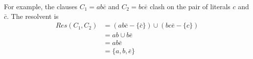 \documentclass[10pt]{article}
\begin{document}
For example, the clauses $C_1=ab\bar{c}$ and $C_2=bc\bar{e}$ clash on the pair of literals $c$ and $\bar{c}$. The resolvent is
\begin{align*}
    Res(C_1,C_2) &= (ab\bar{c} - \{\bar{c}\}) \cup (bc\bar{e} - \{c\})\\
    &=ab \cup b\bar{e}\\
    &=ab\bar{e}\\
    &=\{a,b,\bar{e}\}
\end{align*}

% 
%
\end{document}
